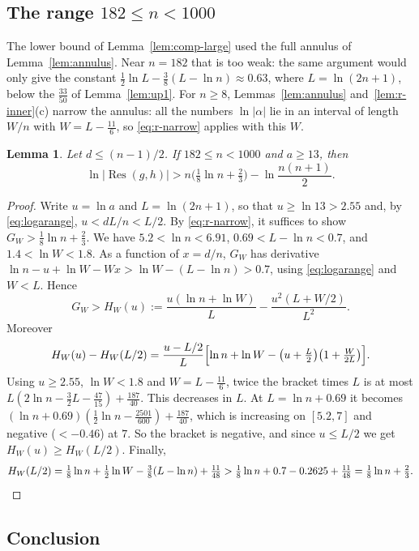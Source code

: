 \documentclass[11pt]{amsart}
\newtheorem{lemma}[theorem]{Lemma}
\theoremstyle{definition}
\theoremstyle{remark}
\numberwithin{equation}{section}
\newcommand{\Res}{\operatorname{Res}}
\begin{document}
\subsection{The range \texorpdfstring{$182\le n<1000$}{182 <= n < 1000}}\label{ssec:r-mid}

The lower bound of Lemma~\ref{lem:comp-large} used the full annulus of
Lemma~\ref{lem:annulus}. Near $n=182$ that is too weak: the same argument
would only give the constant $\frac12\ln L-\frac38(L-\ln n)\approx0.63$,
where $L=\ln(2n+1)$, below the $\frac{33}{50}$ of Lemma~\ref{lem:up1}. For
$n\ge8$, Lemmas~\ref{lem:annulus} and~\ref{lem:r-inner}(c) narrow the
annulus: all the numbers $\ln|\alpha|$ lie in an interval of length $W/n$
with $W=L-\frac{11}6$, so \eqref{eq:r-narrow} applies with this $W$.


\begin{lemma}\label{lem:r-mid}
Let $d\le(n-1)/2$. If $182\le n<1000$ and $a\ge13$, then
\[
 \ln|\Res(g,h)|>n\bigl(\tfrac18\ln n+\tfrac23\bigr)-\ln\frac{n(n+1)}2 .
\]
\end{lemma}

\begin{proof}
Write $u=\ln a$ and $L=\ln(2n+1)$, so that $u\ge\ln13>2.55$ and, by
\eqref{eq:logarange}, $u<dL/n<L/2$. By \eqref{eq:r-narrow}, it
suffices to show $G_W>\frac18\ln n+\frac23$. We have $5.2<\ln n<6.91$,
$0.69<L-\ln n<0.7$, and $1.4<\ln W<1.8$. As a function of $x=d/n$, $G_W$
has derivative $\ln n-u+\ln W-Wx>\ln W-(L-\ln n)>0.7$, using
\eqref{eq:logarange} and $W<L$. Hence
\[
 G_W>H_W(u):=\frac{u(\ln n+\ln W)}L-\frac{u^2(L+W/2)}{L^2}.
\]
Moreover
\[
 H_W(u)-H_W(L/2)=\frac{u-L/2}L
 \Bigl[\ln n+\ln W-\bigl(u+\tfrac L2\bigr)\bigl(1+\tfrac W{2L}\bigr)\Bigr].
\]
Using $u\ge2.55$, $\ln W<1.8$ and $W=L-\frac{11}6$, twice the bracket times
$L$ is at most $L(2\ln n-\frac32L-\frac{47}{15})+\frac{187}{40}$. This
decreases in $L$. At $L=\ln n+0.69$ it becomes
$(\ln n+0.69)(\frac12\ln n-\frac{2501}{600})+\frac{187}{40}$, which is
increasing on $[5.2,7]$ and negative ($<-0.46$) at $7$. So the bracket is
negative, and since $u\le L/2$ we get $H_W(u)\ge H_W(L/2)$. Finally,
\[
 H_W(L/2)=\tfrac18\ln n+\tfrac12\ln W-\tfrac38(L-\ln n)+\tfrac{11}{48}
 >\tfrac18\ln n+0.7-0.2625+\tfrac{11}{48}=\tfrac18\ln n+\tfrac23 .
 \qedhere
\]
\end{proof}

\subsection{Conclusion}
\end{document}
